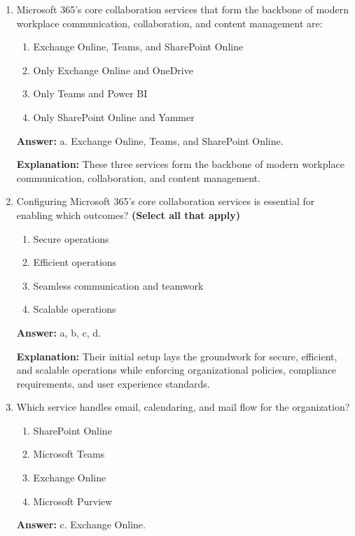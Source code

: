 \documentclass[10pt]{article}
\begin{document}
\begin{enumerate}[leftmargin=*]

\item Microsoft 365’s core collaboration services that form the backbone of modern workplace communication, collaboration, and content management are:

\begin{enumerate}[label=\alph*., leftmargin=1.5em]
\item Exchange Online, Teams, and SharePoint Online
\item Only Exchange Online and OneDrive
\item Only Teams and Power BI
\item Only SharePoint Online and Yammer
\end{enumerate}
\textbf{Answer:} a. Exchange Online, Teams, and SharePoint Online.

\textbf{Explanation:} These three services form the backbone of modern workplace communication, collaboration, and content management.

\item Configuring Microsoft 365’s core collaboration services is essential for enabling which outcomes? \textbf{(Select all that apply)}
\begin{enumerate}[label=\alph*., leftmargin=1.5em]
\item Secure operations
\item Efficient operations
\item Seamless communication and teamwork
\item Scalable operations
\end{enumerate}
\textbf{Answer:} a, b, c, d.

\textbf{Explanation:} Their initial setup lays the groundwork for secure, efficient, and scalable operations while enforcing organizational policies, compliance requirements, and user experience standards.

\item Which service handles email, calendaring, and mail flow for the organization?
\begin{enumerate}[label=\alph*., leftmargin=1.5em]
\item SharePoint Online
\item Microsoft Teams
\item Exchange Online
\item Microsoft Purview
\end{enumerate}
\textbf{Answer:} c. Exchange Online.


\end{enumerate}
\end{document}
